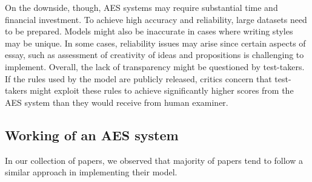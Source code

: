 \documentclass{article}
\begin{document}
	On the downside, though, AES systems may require substantial time and financial investment. To achieve high accuracy and reliability, large datasets need to be prepared. Models might also be inaccurate in cases where writing styles may be unique. In some cases, reliability issues may arise since certain aspects of essay, such as assessment of creativity of ideas and propositions is challenging to implement. Overall, the lack of transparency might be questioned by test-takers. If the rules used by the model are publicly released, critics concern that test-takers might exploit these rules to achieve significantly higher scores from the AES system than they would receive from human examiner. \\ 
	\subsection{Working of an AES system}
	In our collection of papers, we observed that majority of papers tend to follow a similar approach in implementing their model.
\end{document}
